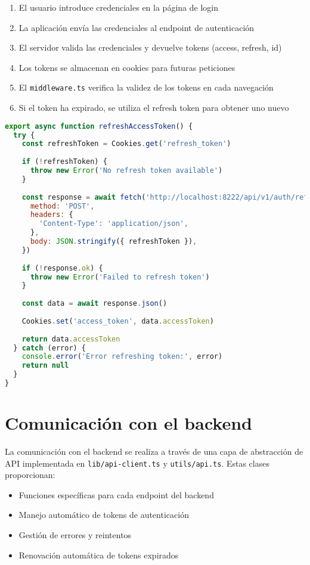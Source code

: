 \documentclass[12pt,a4paper]{report}
\begin{document}
\begin{enumerate}
    \item El usuario introduce credenciales en la página de login
    \item La aplicación envía las credenciales al endpoint de autenticación
    \item El servidor valida las credenciales y devuelve tokens (access, refresh, id)
    \item Los tokens se almacenan en cookies para futuras peticiones
    \item El \texttt{middleware.ts} verifica la validez de los tokens en cada navegación
    \item Si el token ha expirado, se utiliza el refresh token para obtener uno nuevo
\end{enumerate}

\begin{lstlisting}[language=JavaScript, caption=Función de autenticación en lib/auth.ts]
export async function refreshAccessToken() {
  try {
    const refreshToken = Cookies.get('refresh_token')
    
    if (!refreshToken) {
      throw new Error('No refresh token available')
    }
    
    const response = await fetch('http://localhost:8222/api/v1/auth/refresh-token', {
      method: 'POST',
      headers: {
        'Content-Type': 'application/json',
      },
      body: JSON.stringify({ refreshToken }),
    })
    
    if (!response.ok) {
      throw new Error('Failed to refresh token')
    }
    
    const data = await response.json()
    
    Cookies.set('access_token', data.accessToken)
    
    return data.accessToken
  } catch (error) {
    console.error('Error refreshing token:', error)
    return null
  }
}
\end{lstlisting}

\section{Comunicación con el backend}
La comunicación con el backend se realiza a través de una capa de abstracción de API implementada en \texttt{lib/api-client.ts} y \texttt{utils/api.ts}. Estas clases proporcionan:

\begin{itemize}
    \item Funciones específicas para cada endpoint del backend
    \item Manejo automático de tokens de autenticación
    \item Gestión de errores y reintentos
    \item Renovación automática de tokens expirados
\end{itemize}
\end{document}
